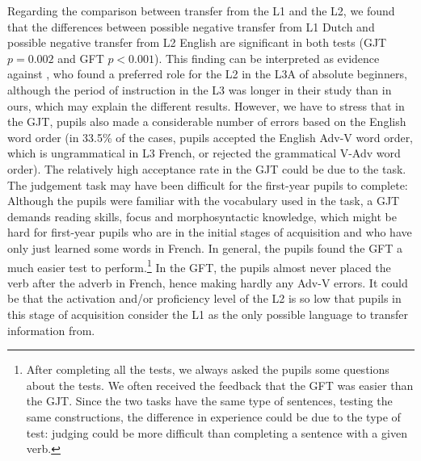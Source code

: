 \documentclass[output=paper]{langsci/langscibook}
\begin{document}
Regarding the comparison between transfer from the L1 and the L2, we found that the differences between possible negative transfer from L1 Dutch and possible negative transfer from L2 English are significant in both tests (GJT $p = 0.002$ and GFT $p < 0.001$). This finding can be interpreted as evidence against \citet{BardelFalk2007}, who found a preferred role for the L2 in the L3A of absolute beginners, although the period of instruction in the L3 was longer in their study than in ours, which may explain the different results. However, we have to stress that in the GJT, pupils also made a considerable number of errors based on the English word order (in 33.5\% of the cases, pupils accepted the English Adv-V word order, which is ungrammatical in L3 French, or rejected the grammatical V-Adv word order). The relatively high acceptance rate in the GJT could be due to the task. The judgement task may have been difficult for the first-year pupils to complete: Although the pupils were familiar with the vocabulary used in the task, a GJT demands reading skills, focus and morphosyntactic knowledge, which might be hard for first-year pupils who are in the initial stages of acquisition and who have only just learned some words in French. In general, the pupils found the GFT a much easier test to perform.\footnote{After completing all the tests, we always asked the pupils some questions about the tests. We often received the feedback that the GFT was easier than the GJT. Since the two tasks have the same type of sentences, testing the same constructions, the difference in experience could be due to the type of test: judging could be more difficult than completing a sentence with a given verb.} In the GFT, the pupils almost never placed the verb after the adverb in French, hence making hardly any Adv-V errors. It could be that the activation and/or proficiency level of the L2 is so low that pupils in this stage of acquisition consider the L1 as the only possible language to transfer information from.
\end{document}
